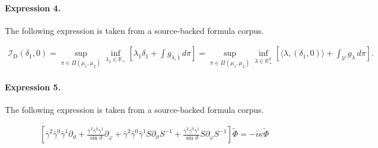 \documentclass[11pt]{article}
\begin{document}
\paragraph{Expression 4.} The following expression is taken from a source-backed formula corpus.

\begin{align*}\mathcal{I}_{\mathrm{D}}(\delta_1, 0) = \sup_{\pi \in \Pi(\mu_1, \mu_2) } \inf _{\lambda_1 \in \mathbb{R}_{+} }\left[ \lambda_1 \delta_1 + \int g_{\lambda, 1} \, d \pi \right] = \sup_{\pi \in \Pi(\mu_1, \mu_2) } \inf _{\lambda \in \mathbb{R}^2_{+} }\left[ \langle \lambda , \left(\delta_1, 0 \right) \rangle + \int_{\mathcal{V}} g_{\lambda} \, d \pi\right].\end{align*}

\paragraph{Expression 5.} The following expression is taken from a source-backed formula corpus.

\begin{align*}\left[ \bar \gamma ^2\bar \gamma ^0\bar \gamma ^1\partial_\vartheta +\frac{\bar \gamma ^3\bar \gamma ^0\bar \gamma ^1}{\sin \vartheta}\partial _\varphi +\bar \gamma ^2\bar \gamma ^0\bar \gamma ^1S\partial_\vartheta S^{-1}+\frac{\bar \gamma ^3\bar \gamma ^0\bar \gamma ^1}{\sin\vartheta }S\partial _\varphi S^{-1}\right] \tilde \Phi =-i\kappa \tilde\Phi\end{align*}
\end{document}

